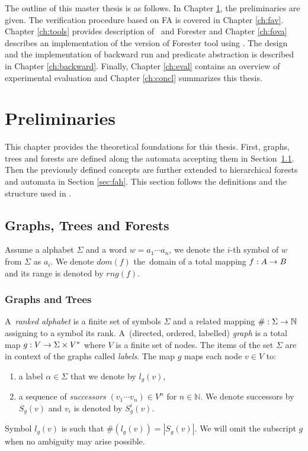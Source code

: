 The outline of this master thesis is as follows.
In Chapter \ref{ch:prel}, the preliminaries are given.
The verification procedure based on FA is covered in Chapter \ref{ch:fav}.
Chapter \ref{ch:tools} provides description of \vata\ and Forester
and Chapter \ref{ch:fova} describes an implementation of the version of Forester tool using \vata.
The design and the implementation of backward run and predicate abstraction
is described in Chapter \ref{ch:backward}.
Finally, Chapter \ref{ch:eval} contains an overview of experimental evaluation and 
Chapter \ref{ch:concl} summarizes this thesis.

\chapter{Preliminaries}
\label{ch:prel}

This chapter provides the theoretical foundations for this thesis.
First, graphs, trees and forests are defined along the automata accepting them in Section~\ref{sec:graph}.
Then the previously defined concepts are further extended to hierarchical forests and automata in Section \ref{sec:fah}.
This section follows the definitions and the structure used in \cite{techrep}.

\section{Graphs, Trees and Forests}
\label{sec:graph}

Assume a alphabet $\Sigma$ and a word $w = a_1 \cdots a_n$, we denote the $i$-th symbol of $w$ from $\Sigma$ as $a_i$.
We denote $dom(f)$ the~domain of a total mapping $f: A \rightarrow B$ and its range is denoted by $rng(f)$.

\subsection{Graphs and Trees}
\label{subsec:graph}
A~\emph{ranked alphabet} is a finite set of symbols $\Sigma$ and a related mapping $\#: \Sigma \rightarrow \mathbb{N}$
assigning to a symbol its rank.
A~(directed, ordered, labelled) \emph{graph} is a total map $g: V \rightarrow \Sigma \times V^{*}$ where $V$ is a finite set of nodes.
The items of the set $\Sigma$ are in context of the graphs called \emph{labels}.
The map $g$ maps each node $v\in V$ to:
\begin{enumerate}
	\item a label $\alpha \in \Sigma$ that we denote by $l_g(v)$,
	\item a sequence of \emph{successors} $(v_1 \cdots v_n) \in V^n$ for $n \in \mathbb{N}$.
		We denote successors by $S_g(v)$ and $v_i$ is denoted by $S^i_g(v)$.
\end{enumerate}
Symbol $l_g(v)$ is such that $\#(l_g(v)) = |S_g(v)|$.
We will omit the subscript $g$ when no ambiguity may arise possible.

